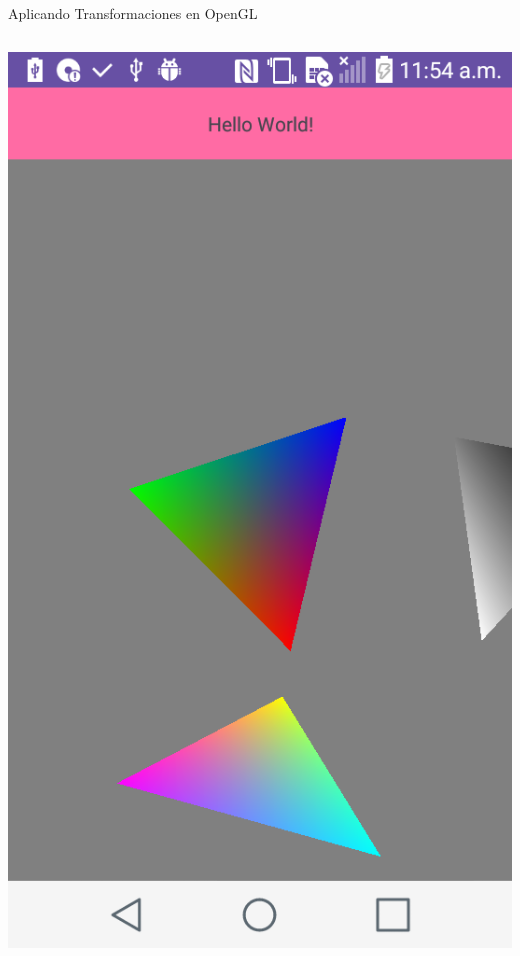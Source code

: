 \documentclass[aspectratio=169,compress]{beamer}
\begin{document}
\begin{frame}{Aplicando Transformaciones en OpenGL}
\begin{columns}
\begin{column}{0.3\textwidth}
\begin{center}
\includegraphics[width=1.0\linewidth]{PantallazosDemoTaller/Demo6.png}
\end{center}
\end{column}
\end{columns}


\end{frame}
\end{document}
